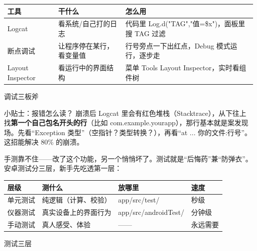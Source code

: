 


\begin{center}
\begin{tabularx}{\linewidth}{|X|X|X|}
\hline
\textbf{工具} & \textbf{干什么} & \textbf{怎么用} \tabularnewline
\hline
Logcat & 看系统/自己打的日志 & 代码里 Log.d("TAG","值=\$x")，面板里搜 TAG 过滤 \tabularnewline
断点调试 & 让程序停在某行，看变量值 & 行号旁点一下出红点，Debug 模式运行，逐步走 \tabularnewline
Layout Inspector & 看运行中的界面结构 & 菜单 Tools Layout Inspector，实时看组件树 \tabularnewline
\hline
\end{tabularx}
\end{center}

\begin{center}\small\color{gray}调试三板斧\end{center}

\begin{tcbinfo}{小贴士：报错怎么读？}
崩溃后 Logcat 里会有红色堆栈（Stacktrace），从下往上找\textbf{第一个自己包名开头的行}（比如 com.example.yourapp），那行基本就是案发现场。先看“Exception 类型”（空指针？类型转换？），再看“at ... 你的文件:行号”。这招能解决 80\% 的崩溃。

\end{tcbinfo}


手测靠不住——改了这个功能，另一个悄悄坏了。测试就是“后悔药”兼“防弹衣”。安卓测试分三层，新手先吃透第一层：

\begin{center}
\begin{tabularx}{\linewidth}{|X|X|X|X|}
\hline
\textbf{层级} & \textbf{测什么} & \textbf{放哪里} & \textbf{速度} \tabularnewline
\hline
单元测试 & 纯逻辑（计算、校验） & app/src/test/ & 秒级 \tabularnewline
仪器测试 & 真实设备上的界面行为 & app/src/androidTest/ & 分钟级 \tabularnewline
手动测试 & 真人感受、体验 & —— & 永远需要 \tabularnewline
\hline
\end{tabularx}
\end{center}

\begin{center}\small\color{gray}测试三层\end{center}

